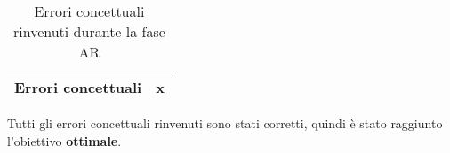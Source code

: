 \documentclass[PianoDiQualifica.tex]{subfiles}
\begin{document}
					\begin{table}[h]
				\centering
				\begin{tabular}{l c}
					\hline
					\rule[0cm]{0cm}{0.4cm}
					Errori concettuali & x \\
					\hline
				\end{tabular}
				\caption{Errori concettuali rinvenuti durante la fase AR}
			\end{table}	
			
			Tutti gli errori concettuali rinvenuti sono stati corretti, quindi è stato
raggiunto l’obiettivo \textbf{ottimale}.
\end{document}
